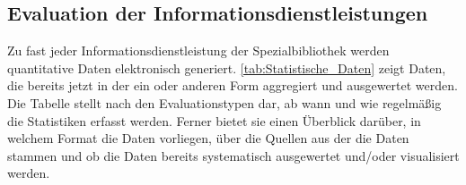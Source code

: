 \subsection{Evaluation der Informationsdienstleistungen}

Zu fast jeder Informationsdienstleistung der Spezialbibliothek werden quantitative Daten elektronisch generiert. 
\autoref{tab:Statistische_Daten} zeigt Daten, die bereits jetzt in der ein oder anderen Form aggregiert und ausgewertet werden. 
Die Tabelle stellt nach den Evaluationstypen dar, ab wann und wie regelmäßig die Statistiken erfasst werden. Ferner bietet sie einen Überblick darüber, in welchem 
Format die Daten vorliegen, über die Quellen aus der die Daten stammen und ob die Daten bereits systematisch ausgewertet und/oder visualisiert werden.


\begingroup
\setlength{\tabcolsep}{4pt} %
\renewcommand{\arraystretch}{1.5}
